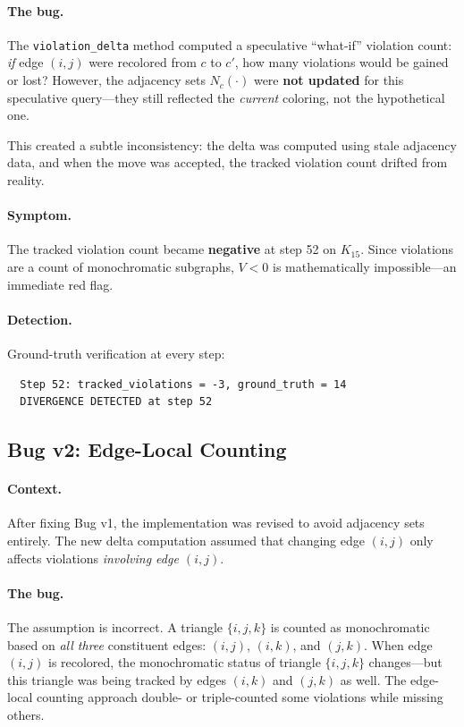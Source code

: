 \documentclass[11pt,a4paper]{article}
\theoremstyle{definition}
\theoremstyle{remark}
\begin{document}
\paragraph{The bug.}
The \texttt{violation\_delta} method computed a speculative ``what-if''
violation count: \emph{if} edge $(i,j)$ were recolored from $c$ to $c'$,
how many violations would be gained or lost?
However, the adjacency sets $N_c(\cdot)$ were \textbf{not updated} for
this speculative query---they still reflected the \emph{current}
coloring, not the hypothetical one.

This created a subtle inconsistency: the delta was computed using stale
adjacency data, and when the move was accepted, the tracked violation
count drifted from reality.

\paragraph{Symptom.}
The tracked violation count became \textbf{negative} at step 52 on
$K_{15}$.  Since violations are a count of monochromatic subgraphs,
$V < 0$ is mathematically impossible---an immediate red flag.

\paragraph{Detection.}
Ground-truth verification at every step:
\begin{verbatim}
  Step 52: tracked_violations = -3, ground_truth = 14
  DIVERGENCE DETECTED at step 52
\end{verbatim}

\subsection{Bug v2: Edge-Local Counting}\label{sec:bug2}

\paragraph{Context.}
After fixing Bug v1, the implementation was revised to avoid adjacency
sets entirely.  The new delta computation assumed that changing edge
$(i,j)$ only affects violations \emph{involving edge $(i,j)$}.

\paragraph{The bug.}
The assumption is incorrect.  A triangle $\{i,j,k\}$ is counted as
monochromatic based on \emph{all three} constituent edges: $(i,j)$,
$(i,k)$, and $(j,k)$.  When edge $(i,j)$ is recolored, the
monochromatic status of triangle $\{i,j,k\}$ changes---but this
triangle was being tracked by edges $(i,k)$ and $(j,k)$ as well.
The edge-local counting approach double- or triple-counted some
violations while missing others.
\end{document}
